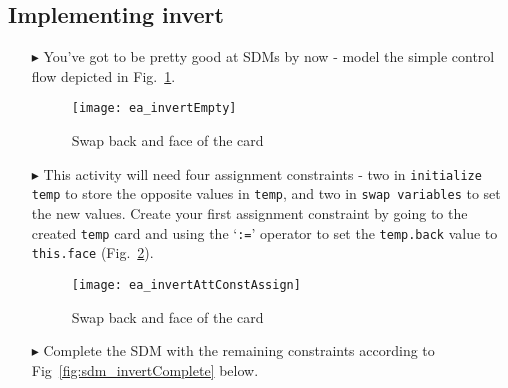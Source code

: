 \newpage
\hypertarget{invertCard vis}{}
\subsection{Implementing invert}
\visHeader

\begin{itemize}

\vspace{0.5cm}

\item[$\blacktriangleright$] You've got to be pretty good at SDMs by now - model the simple control flow depicted in Fig.~\ref{fig:sdm_invertEmpty}. 

\vspace{0.5cm}

\begin{figure}[htbp]
\begin{center}
  \texttt{[image: ea\_invertEmpty]}
  \caption{Swap back and face of the card}  
  \label{fig:sdm_invertEmpty}
\end{center}
\end{figure}

\vspace{0.5cm}

\item[$\blacktriangleright$] This activity will need four assignment constraints - two in \texttt{initialize temp} to store the opposite values in
\texttt{temp}, and two in \texttt{swap variables} to set the new values. Create your first assignment constraint by going to the created \texttt{temp} card and
using the `\texttt{:=}' operator to set the \texttt{temp.back} value to \texttt{this.face} (Fig.~\ref{fig:sdm_invertAssignment}).

\begin{figure}[htbp]
\begin{center}
  \texttt{[image: ea\_invertAttConstAssign]}
  \caption{Swap back and face of the card}  
  \label{fig:sdm_invertAssignment}
\end{center}
\end{figure}

\clearpage

\vspace*{0.5cm}

\item[$\blacktriangleright$] Complete the SDM with the remaining constraints according to Fig~\ref{fig:sdm_invertComplete} below.

\vspace{0.5cm}


\end{itemize}
